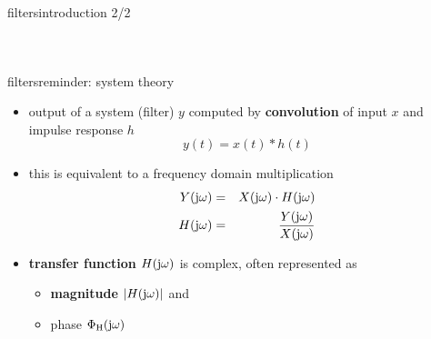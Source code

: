\begin{frame}{filters}{introduction 2/2}
\begin{columns}
{\begin{figure}
                    \end{figure}}
        \end{columns}
	\end{frame}
 
    \begin{frame}{filters}{reminder: system theory}
        \begin{itemize}
            \item output of a system (filter) $y$ computed by \textbf{convolution} of input $x$ and impulse response $h$
                \begin{equation*}
                    y(t) = x(t) \ast h(t)   
                \end{equation*}
            \bigskip
            \item<2-> this is equivalent to a frequency domain multiplication 
                \begin{eqnarray*}
                    Y(\mathrm{j}\omega) &=& X(\mathrm{j}\omega) \cdot H(\mathrm{j}\omega)\\
                    H(\mathrm{j}\omega) &=& \frac{Y(\mathrm{j}\omega)}{X(\mathrm{j}\omega)}
                \end{eqnarray*}
            \bigskip
            \item<3-> \textbf{transfer function} $H(\mathrm{j}\omega)$ is complex, often represented as 
                \begin{itemize}
                    \item \textbf{magnitude} $|H(\mathrm{j}\omega)|$ and 
                    \item phase $\Phi_\mathrm{H}(\mathrm{j}\omega)$
                \end{itemize}
        \end{itemize}
    \end{frame}
   

